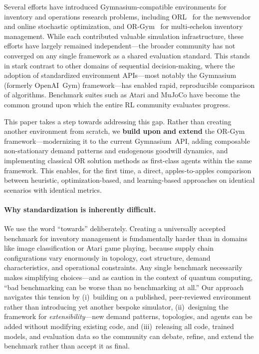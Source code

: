 \documentclass[preprint,12pt]{elsarticle}
\begin{document}
Several efforts have introduced Gymnasium-compatible environments for
inventory and operations research problems, including
ORL~\citep{balaji2019orl} for the newsvendor and online stochastic
optimization, and OR-Gym~\citep{hubbs2020orgym} for multi-echelon
inventory management. While each contributed valuable simulation
infrastructure, these efforts have largely remained independent---the
broader community has not converged on any single framework as a shared
evaluation standard. This stands in stark contrast to other domains of
sequential decision-making, where the adoption of standardized environment
APIs---most notably the Gymnasium (formerly OpenAI~Gym)
framework---has enabled rapid, reproducible comparison of algorithms.
Benchmark suites such as Atari and MuJoCo have become the common ground
upon which the entire RL community evaluates progress.

This paper takes a step towards addressing this gap.  Rather than creating
another environment from scratch, we \textbf{build upon and extend} the
OR-Gym framework---modernizing it to the current Gymnasium~API, adding
composable non-stationary demand patterns and endogenous goodwill dynamics,
and implementing classical OR solution methods as first-class agents
within the same framework. This enables, for the first time, a direct,
apples-to-apples comparison between heuristic, optimization-based, and
learning-based approaches on identical scenarios with identical metrics.

\paragraph{Why standardization is inherently difficult.}
We use the word ``towards'' deliberately. Creating a universally accepted
benchmark for inventory management is fundamentally harder than in domains
like image classification or Atari game playing, because supply chain
configurations vary enormously in topology, cost structure, demand
characteristics, and operational constraints. Any single benchmark
necessarily makes simplifying choices---and as \citet{acuaviva2024quantum}
caution in the context of quantum computing, ``bad benchmarking can be
worse than no benchmarking at all.'' Our approach navigates this tension by
(i)~building on a published, peer-reviewed environment rather than
introducing yet another bespoke simulator, (ii)~designing the framework
for \emph{extensibility}---new demand patterns, topologies, and agents
can be added without modifying existing code, and (iii)~releasing all code,
trained models, and evaluation data so the community can debate, refine,
and extend the benchmark rather than accept it as final.
\end{document}
